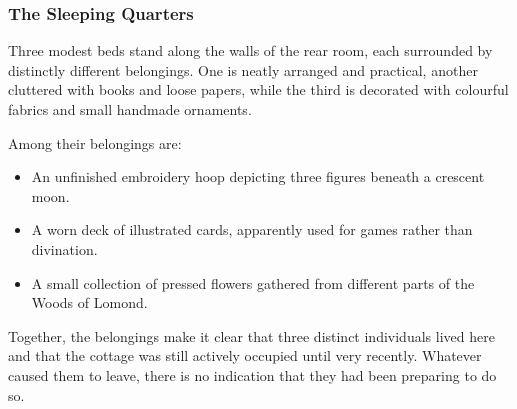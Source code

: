 \subsubsection*{The Sleeping Quarters}
{\entryfont Three modest beds stand along the walls of the rear room, each surrounded by distinctly different belongings. One is neatly arranged and practical, another cluttered with books and loose papers, while the third is decorated with colourful fabrics and small handmade ornaments.

Among their belongings are:
\begin{itemize}
	\item An unfinished embroidery hoop depicting three figures beneath a crescent moon.
	\item A worn deck of illustrated cards, apparently used for games rather than divination.
	\item A small collection of pressed flowers gathered from different parts of the Woods of Lomond.
\end{itemize}
\noindent Together, the belongings make it clear that three distinct individuals lived here and that the cottage was still actively occupied until very recently. Whatever caused them to leave, there is no indication that they had been preparing to do so.}


